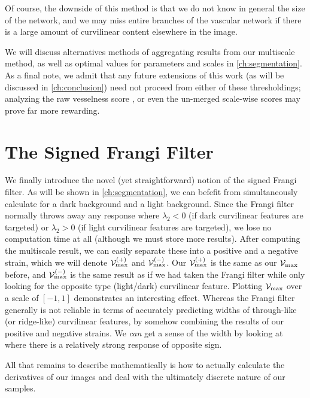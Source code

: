 Of course, the downside of this method is that we do not know in general the size of the network, and  we may miss entire branches of the vascular network if there is a large amount of curvilinear content elsewhere in the image.

We will discuss alternatives methods of aggregating results from our multiscale method, as well as optimal values for parameters and scales
in \cref{ch:segmentation}. As a final note, we admit that any future extensions of this work (as will be discussed in \cref{ch:conclusion}) need not proceed from either of these thresholdings; analyzing the raw vesselness score \Vmax, or even the un-merged scale-wise scores may prove far more rewarding.

\section{The Signed Frangi Filter} \label{sec:signed-frangi-filter}
We finally introduce the novel (yet straightforward) notion of the signed Frangi filter. As will be shown in \cref{ch:segmentation}, we can befefit from simultaneously calculate for a dark background and a light background. Since the Frangi filter normally throws away any response where $\lambda_2 < 0$ (if dark curvilinear features are targeted) or $\lambda_2 >0$ (if light curvilinear features are targeted), we lose no computation time at all (although we must store more results). After computing the multiscale result, we can easily separate these into a positive and a negative strain, which we will denote
$\mathcal{V}_{\max}^{(+)}$ and $\mathcal{V}_{\max}^{(-)}$. Our $\mathcal{V}_{\max}^{(+)}$ is the same as our $\mathcal{V}_{\max}$ before, and $\mathcal{V}_{\max}^{(-)}$ is the same result as if we had taken the Frangi filter while only looking for the opposite type (light/dark) curvilinear feature. Plotting $\mathcal{V}_{\max}$ over a scale of $[-1,1]$ demonstrates an interesting effect. Whereas the Frangi filter generally is not reliable in terms of accurately predicting widths of through-like (or ridge-like) curvilinear features, by somehow combining the results of our positive and negative strains. We \textit{can} get a sense of the width by looking at where there is a relatively strong response of opposite sign.


All that remains to describe mathematically is how to actually calculate the derivatives of our images and deal with the ultimately discrete nature of our samples.    